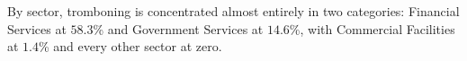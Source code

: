 \documentclass[sigconf,anonymous,10pt]{acmart}
\begin{document}

By sector, tromboning is concentrated almost entirely in two categories: Financial Services at $58.3$\% and Government Services at $14.6$\%, with Commercial Facilities at $1.4$\% and every other sector at zero.


\end{document}
